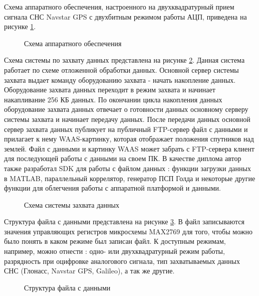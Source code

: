 Схема аппаратного обеспечения, настроенного на двухквадратурный прием сигнала СНС Navstar GPS с двухбитным режимом работы АЦП, приведена на рисунке \ref{pic:board_scheme}.
\begin{figure}[H]
	\center{}
	\caption{Схема аппаратного обеспечения}
	\label{pic:board_scheme}
\end{figure}

Схема системы по захвату данных представлена на рисунке \ref{pic:gps_acq_system_scheme}. Данная система работает по схеме отложенной обработки данных. Основной сервер системы захвата
выдает команду оборудованию захвата - начать накопление данных. Оборудование захвата данных переходит в режим захвата и начинает накапливание 256 КБ данных. По окончании цикла
накопления данных оборудование захвата данных отвечает о готовности данных основному серверу системы захвата и начинает передачу данных. После передачи данных основной сервер
захвата данных публикует на публичный FTP-сервер файл с данными и прилагает к нему WAAS-картинку, которая отображает положения спутников над землей. Файл с данными
и картинку WAAS может забрать с FTP-сервера клиент для последующей работы с данными на своем ПК. В качестве диплома автор также разработал SDK для работы с файлом данных
\cite{github-gpsproject}: функции загрузки данных в MATLAB, параллельный коррелятор, генератор ПСП Голда и некоторые другие функции для облегчения работы с аппаратной платформой
и данными.

\begin{figure}[H]
	\center{}
	\caption{Схема системы захвата данных}
	\label{pic:gps_acq_system_scheme}
\end{figure}

Структура файла с данными представлена на рисунке \ref{pic:dump_file}. В файл записываются значения управляющих регистров микросхемы MAX2769 для того, чтобы можно было
понять в каком режиме был записан файл. К доступным режимам, например, можно отнести \cite{max2769_manual}: одно- или двухквадратурный режим работы, разрядность при оцифровке
аналогового сигнала, тип захватываемых данных СНС (Глонасс, Navstar GPS, Galileo), а так же другие.
\begin{figure}[H]
	\center{}
	\caption{Структура файла с данными}
	\label{pic:dump_file}
\end{figure}

